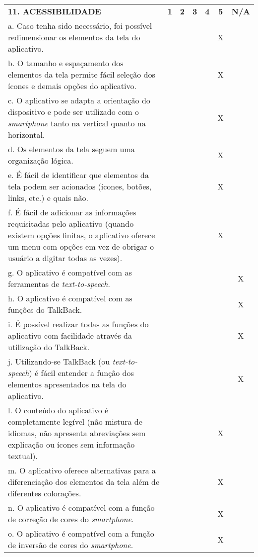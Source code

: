 \documentclass[portuguese,oneside]{tcc}
\begin{document}
\begin{center}
\begin{longtabu}{|L{25em}|c|c|c|c|c|c|}
												\textbf{11. ACESSIBILIDADE} & \textbf{1} & \textbf{2} & \textbf{3} & \textbf{4} & \textbf{5} & \textbf{N/A} \\ 
												a. Caso tenha sido necessário, foi possível redimensionar os elementos da tela do aplicativo. & & & & & X & \\ 
												b. O tamanho e espaçamento dos elementos da tela permite fácil seleção dos ícones e demais opções do aplicativo. & & & & & X & \\ 
												c. O aplicativo se adapta a orientação do dispositivo e pode ser utilizado com o \emph{smartphone} tanto na vertical quanto na horizontal. & & & & & X & \\ 
												d. Os elementos da tela seguem uma organização lógica. & & & & & X & \\ 
												e. É fácil de identificar que elementos da tela podem ser acionados (ícones, botões, links, etc.) e quais não. & & & & & X & \\ 
												f. É fácil de adicionar as informações requisitadas pelo aplicativo (quando existem opções finitas, o aplicativo oferece um menu com opções em vez de obrigar o usuário a digitar todas as vezes). & & & & & X & \\ 
												g. O aplicativo é compatível com as ferramentas de \emph{text-to-speech}. & & & & & & X \\ 
												h. O aplicativo é compatível com as funções do TalkBack. & & & & & & X \\ 
												i. É possível realizar todas as funções do aplicativo com facilidade através da utilização do TalkBack.	& & & & & & X \\ 
												j. Utilizando-se TalkBack (ou \emph{text-to-speech}) é fácil entender a função dos elementos apresentados na tela do aplicativo. & & & & & & X \\ 
												l. O conteúdo do aplicativo é completamente legível (não mistura de idiomas, não apresenta abreviações sem explicação ou ícones sem informação textual). & & & & & X & \\ 
												m. O aplicativo oferece alternativas para a diferenciação dos elementos da tela além de diferentes colorações. & & & & & X & \\ 
												n. O aplicativo é compatível com a função de correção de cores do \emph{smartphone}. & & & & & X & \\ 
												o. O aplicativo é compatível com a função de inversão de cores do \emph{smartphone}. & & & & & X & \\ 
											\end{longtabu}
										\end{center}
										
\end{document}
